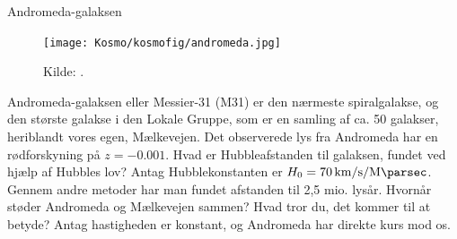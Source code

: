 \documentclass[crop=false, class=memoir]{standalone}
\begin{document}
\begin{opgave}[1]{Andromeda-galaksen}
		\begin{figure}[]
			\centering
			\texttt{[image: Kosmo/kosmofig/andromeda.jpg]}
			\caption{Kilde: \cite{AndromedaGalaxy2019}.} %
			\label{andromeda} 
		\end{figure}
	Andromeda-galaksen eller Messier-31 (M31) er den nærmeste spiralgalakse, og den største galakse i den Lokale Gruppe, som er en samling af ca. 50 galakser, heriblandt vores egen, Mælkevejen.  
	\opg Det observerede lys fra Andromeda har en rødforskyning på $z = -0.001$.
	Hvad er Hubbleafstanden til galaksen, fundet ved hjælp af Hubbles lov? Antag Hubblekonstanten er $H_0 = \SI{70}{\km\per\second\per\mega\parsec}$.
	\opg Gennem andre metoder har man fundet afstanden til 2,5 mio. lysår. Hvornår støder Andromeda og Mælkevejen sammen? Hvad tror du, det kommer til at betyde? Antag hastigheden er konstant, og Andromeda har direkte kurs mod os.
\end{opgave}
\end{document}
